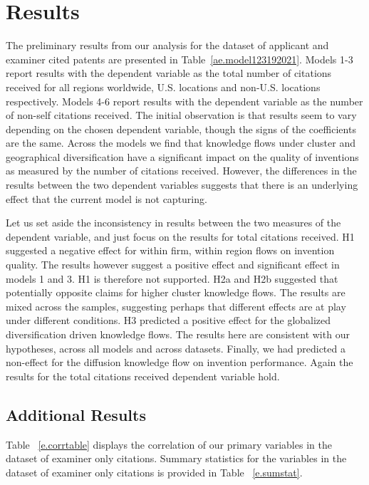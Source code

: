 \documentclass[12pt,letterpaper]{article}
\begin{document}
%
%



\section*{Results}
The preliminary results from our analysis for the dataset of applicant and examiner cited patents are presented in Table~\ref{ae.model123192021}. Models 1-3 report results with the dependent variable as the total number of citations received for all regions worldwide, U.S. locations and non-U.S. locations respectively. Models 4-6 report results with the dependent variable as the number of non-self citations received. The initial observation is that results seem to vary depending on the chosen dependent variable, though the signs of the coefficients are the same. Across the models we find that knowledge flows under cluster and geographical diversification have a significant impact on the quality of inventions as measured by the number of citations received. However, the differences in the results between the two dependent variables suggests that there is an underlying effect that the current model is not capturing. \par
Let us set aside the inconsistency in results between the two measures of the dependent variable, and just focus on the results for total citations received. H1 suggested a negative effect for within firm, within region flows on invention quality. The results however suggest a positive effect and significant effect in models 1 and 3. H1 is therefore not supported. H2a and H2b suggested that potentially opposite claims for higher cluster knowledge flows. The results are mixed across the samples, suggesting perhaps that different effects are at play under different conditions. H3 predicted a positive effect for the globalized diversification driven knowledge flows. The results here are consistent with our hypotheses, across all models and across datasets. Finally, we had predicted a non-effect for the diffusion knowledge flow on invention performance. Again the results for the total citations received dependent variable hold.  \par

%

\subsection{Additional Results}
Table ~\ref{e.corrtable} displays the correlation of our primary variables in the dataset of examiner only citations. Summary statistics for the variables in the dataset of examiner only citations is provided in Table ~\ref{e.sumstat}.
\end{document}
